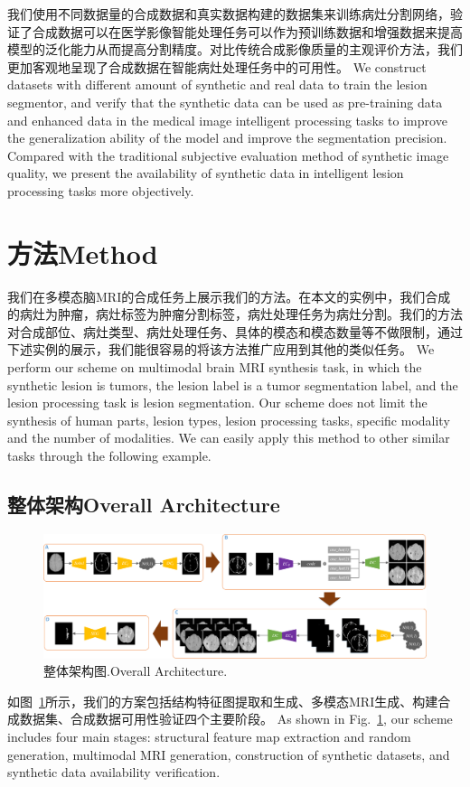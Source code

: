 \documentclass[letterpaper]{article} %
\begin{document}
\begin{itemize}
	我们使用不同数据量的合成数据和真实数据构建的数据集来训练病灶分割网络，验证了合成数据可以在医学影像智能处理任务可以作为预训练数据和增强数据来提高模型的泛化能力从而提高分割精度。对比传统合成影像质量的主观评价方法，我们更加客观地呈现了合成数据在智能病灶处理任务中的可用性。
	We construct datasets with different amount of synthetic and real data to train the lesion segmentor, and verify that the synthetic data can be used as pre-training data and enhanced data in the medical image intelligent processing tasks to improve the generalization ability of the model and improve the segmentation precision. Compared with the traditional subjective evaluation method of synthetic image quality, we present the availability of synthetic data in intelligent lesion processing tasks more objectively.
\end{itemize}


\section{方法Method}
\label{method}
我们在多模态脑MRI的合成任务上展示我们的方法。在本文的实例中，我们合成的病灶为肿瘤，病灶标签为肿瘤分割标签，病灶处理任务为病灶分割。我们的方法对合成部位、病灶类型、病灶处理任务、具体的模态和模态数量等不做限制，通过下述实例的展示，我们能很容易的将该方法推广应用到其他的类似任务。
We perform our scheme on multimodal brain MRI synthesis task, in which the synthetic lesion is tumors, the lesion label is a tumor segmentation label, and the lesion processing task is lesion segmentation. Our scheme does not limit the synthesis of human parts, lesion types, lesion processing tasks, specific modality and the number of modalities. We can easily apply this method to other similar tasks through the following example.
\subsection{整体架构Overall Architecture}
\begin{figure}[t]
	\centering
	\includegraphics[width=0.98\columnwidth]{figures/architecture}
	\caption{整体架构图.Overall Architecture.}
	\label{architecture}
\end{figure}
如图~\ref{architecture}所示，我们的方案包括结构特征图提取和生成、多模态MRI生成、构建合成数据集、合成数据可用性验证四个主要阶段。
As shown in Fig.~\ref{architecture}, our scheme includes four main stages: structural feature map extraction and random generation, multimodal MRI generation, construction of synthetic datasets, and synthetic data availability verification.
\end{document}
